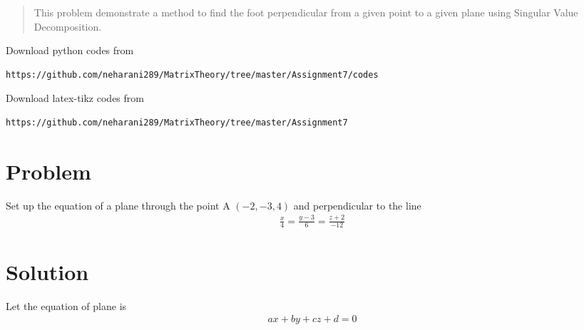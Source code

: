 \documentclass[journal,12pt,twocolumn]{IEEEtran}
\begin{document}
	
	\maketitle
	\newpage
	\bigskip
	\renewcommand{\thefigure}{\theenumi}
	\renewcommand{\thetable}{\theenumi}
	\date{Today}
	
\begin{abstract}
This problem demonstrate a method to  find the foot perpendicular  from a given point to a given plane using Singular Value Decomposition.
\end{abstract}
Download python codes from 
%
\begin{lstlisting}
https://github.com/neharani289/MatrixTheory/tree/master/Assignment7/codes
\end{lstlisting}
%
%
Download latex-tikz codes from 
%
\begin{lstlisting}
https://github.com/neharani289/MatrixTheory/tree/master/Assignment7
\end{lstlisting}
\section{\textbf{Problem}}
Set up the equation of a plane through the point A $\left(-2, -3, 4 \right)$ and perpendicular to the line 
\begin{align}
\frac{x}{4} = \frac{y - 3}{6} = \frac{z+2}{-12} \label{eq1.1}
\end{align}
 \section{\textbf{Solution}} 
 Let the equation of plane is 
 \begin{align}
 ax +by +cz +d = 0 \label{eq2.1}
 \end{align}
 
\end{document}
